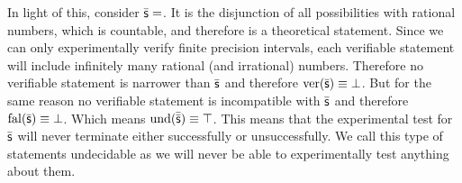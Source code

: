 	In light of this, consider $\bar{\mathsf{s}}=$. It is the disjunction of all possibilities with rational numbers, which is countable, and therefore is a theoretical statement. Since we can only experimentally verify finite precision intervals, each verifiable statement will include infinitely many rational (and irrational) numbers. Therefore no verifiable statement is narrower than $\bar{\mathsf{s}}$ and therefore $\operatorname{ver}(\bar{\mathsf{s}}) \equiv \bot$. But for the same reason no verifiable statement is incompatible with  $\bar{\mathsf{s}}$ and therefore $\operatorname{fal}(\bar{\mathsf{s}}) \equiv \bot$. Which means $\operatorname{und}(\bar{\bar{\mathsf{s}}}) \equiv \top$. This means that the experimental test for $\bar{\mathsf{s}}$ will never terminate either successfully or unsuccessfully. We call this type of statements undecidable as we will never be able to experimentally test anything about them.
	
